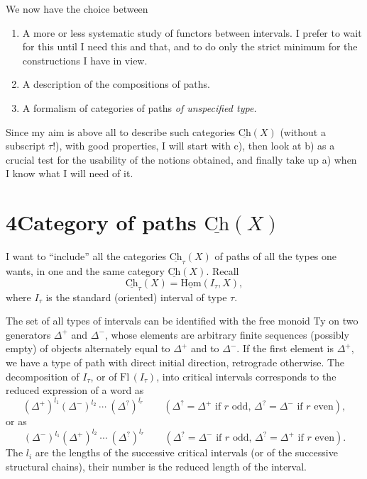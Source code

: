 \documentclass[11pt]{article}
\newcommand{\printedpage}[1]{\marginpar{\footnotesize p.~#1}}
\newcommand{\msp}[1]{\marginpar{\footnotesize [#1]}}
\newcommand{\uHom}{\underline{\mathrm{Hom}}}
\newcommand{\uCh}{\underline{\mathrm{Ch}}}
\begin{document}
\msp{page 24}
We now have the choice between

\begin{enumerate}[label=\alph*)]
\item A more or less systematic study of functors between intervals. I prefer to wait for this until I need this and that, and to do only the strict minimum for the constructions I have in view.
\item A description of the compositions of paths. %
\item A formalism of categories of paths \textit{of unspecified type.}
\end{enumerate}

Since my aim is above all to describe such categories $\uCh(X)$ (without a subscript $\tau$!), with good properties, I will start with c), then look at b) as a crucial test for the usability of the notions obtained, and finally take up a) when I know what I will need of it.

\printedpage{16}

\section*{4\quad Category of paths $\uCh(X)$}

I want to ``include'' all the categories $\uCh_\tau(X)$ of paths of all the types one wants, in one and the same category $\uCh(X)$. Recall
\[
\uCh_\tau(X)=\uHom(I_\tau,X),
\]
where $I_\tau$ is the standard (oriented) interval of type $\tau$.

The set of all types of intervals
\msp{page 25}
can be identified with the free monoid Ty on two generators $\Delta^+$ and $\Delta^-$, whose elements are arbitrary finite sequences (possibly empty) of objects alternately equal to $\Delta^+$ and to $\Delta^-$. If the first element is $\Delta^+$, we have a type of path with direct initial direction, retrograde otherwise. The decomposition of $I_\tau$, or of $\mathrm{Fl}\,(I_\tau)$, into critical intervals corresponds to the reduced expression of a word as %
\[
(\Delta^+)^{l_1}(\Delta^-)^{l_2}\ \cdots\ (\Delta^?)^{l_r} \qquad (\Delta^?=\Delta^+ \text{ if } r \text{ odd, } \Delta^?=\Delta^- \text{ if } r \text{ even}),
\]
or as
\[
(\Delta^-)^{l_1}(\Delta^+)^{l_2}\ \cdots\ (\Delta^?)^{l_r} \qquad (\Delta^?=\Delta^- \text{ if } r \text{ odd, } \Delta^?=\Delta^+ \text{ if } r \text{ even}).
\]
The $l_i$ are the lengths of the successive critical intervals (or of the successive structural chains), their number is the reduced length of the interval.
\end{document}
